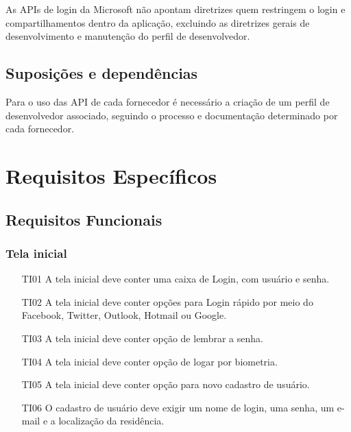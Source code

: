 \documentclass[12pt]{article}
\begin{document}
As APIs de login da Microsoft não apontam diretrizes quem restringem o  login e compartilhamentos dentro da aplicação, excluindo as diretrizes gerais de desenvolvimento e manutenção do perfil de desenvolvedor.
 
\subsection{Suposições e dependências}

Para o uso das API de cada fornecedor é necessário a criação de um perfil de desenvolvedor associado, seguindo o processo e documentação determinado por cada fornecedor. 

\section{Requisitos Específicos}
\subsection{Requisitos Funcionais}
\label{subsec:RequisitosFuncionais}

\subsubsection{Tela inicial} 
\begin{enumerate}
    \item [TI01] A tela inicial deve conter uma caixa de Login, com usuário e senha.
    \item [TI02] A tela inicial deve conter opções para Login rápido por meio do Facebook, Twitter, Outlook, Hotmail ou Google.
    \item [TI03] A tela inicial deve conter opção de lembrar a senha.
    \item [TI04] A tela inicial deve conter opção de logar por biometria.
    \item [TI05] A tela inicial deve conter opção para novo cadastro de usuário.
    \item [TI06] O cadastro de usuário deve exigir um nome de login, uma senha, um e-mail e a localização da residência.
\end{enumerate}
\end{document}
